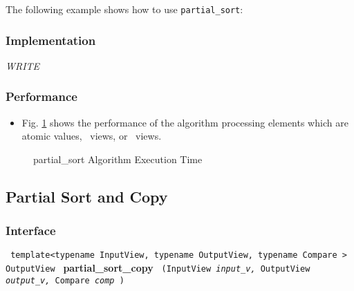 The following example shows how to use \texttt{partial\_sort}:

 
\subsubsection{Implementation} %

\textit{WRITE}

\subsubsection{Performance} %

\begin{itemize}
\item
Fig. \ref{fig:part-sort-alg-exec-exper}
shows the performance of the algorithm processing
elements which are atomic values, \stl\ views, or \stapl\ views.
\end{itemize}

\begin{figure}[p]
\caption{partial\_sort Algorithm Execution Time}
\label{fig:part-sort-alg-exec-exper}
\end{figure}


\subsection{Partial Sort and Copy} \label{sec-sort-part_sort}

\subsubsection{Interface} %

\noindent
\texttt{%
template<typename InputView, typename OutputView, typename Compare >
\newline
OutputView 
}
\newline
\textbf{partial\_sort\_copy}%
\texttt{%
(InputView 
\textit{input\_v,}%
OutputView 
\textit{output\_v,}%
Compare 
\textit{comp}%
)
}
\vspace{0.4cm}

